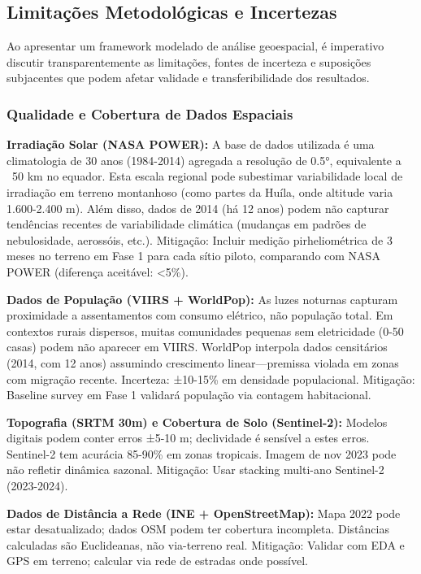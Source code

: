 \documentclass[12pt, a4paper]{article}
\begin{document}
\subsection{Limitações Metodológicas e Incertezas}

Ao apresentar um framework modelado de análise geoespacial, é imperativo discutir transparentemente as limitações, fontes de incerteza e suposições subjacentes que podem afetar validade e transferibilidade dos resultados.

\subsubsection{Qualidade e Cobertura de Dados Espaciais}

\textbf{Irradiação Solar (NASA POWER):} A base de dados utilizada é uma climatologia de 30 anos (1984-2014) agregada a resolução de 0.5°, equivalente a ~50 km no equador. Esta escala regional pode subestimar variabilidade local de irradiação em terreno montanhoso (como partes da Huíla, onde altitude varia 1.600-2.400 m). Além disso, dados de 2014 (há 12 anos) podem não capturar tendências recentes de variabilidade climática (mudanças em padrões de nebulosidade, aerossóis, etc.). Mitigação: Incluir medição pirheliométrica de 3 meses no terreno em Fase 1 para cada sítio piloto, comparando com NASA POWER (diferença aceitável: <5\%).

\textbf{Dados de População (VIIRS + WorldPop):} As luzes noturnas capturam proximidade a assentamentos com consumo elétrico, não população total. Em contextos rurais dispersos, muitas comunidades pequenas sem eletricidade (0-50 casas) podem não aparecer em VIIRS. WorldPop interpola dados censitários (2014, com 12 anos) assumindo crescimento linear—premissa violada em zonas com migração recente. Incerteza: ±10-15\% em densidade populacional. Mitigação: Baseline survey em Fase 1 validará população via contagem habitacional.

\textbf{Topografia (SRTM 30m) e Cobertura de Solo (Sentinel-2):} Modelos digitais podem conter erros ±5-10 m; declividade é sensível a estes erros. Sentinel-2 tem acurácia 85-90\% em zonas tropicais. Imagem de nov 2023 pode não refletir dinâmica sazonal. Mitigação: Usar stacking multi-ano Sentinel-2 (2023-2024).

\textbf{Dados de Distância a Rede (INE + OpenStreetMap):} Mapa 2022 pode estar desatualizado; dados OSM podem ter cobertura incompleta. Distâncias calculadas são Euclideanas, não via-terreno real. Mitigação: Validar com EDA e GPS em terreno; calcular via rede de estradas onde possível.
\end{document}
